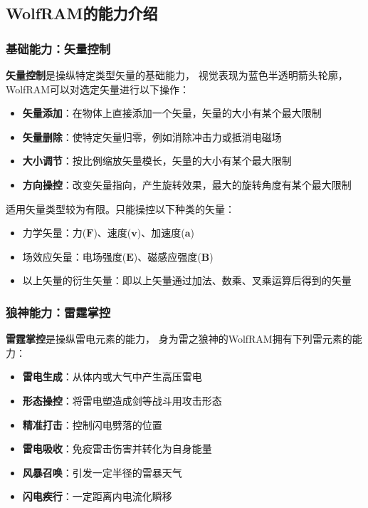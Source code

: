 \documentclass[lang=cn,newtx,10pt,scheme=chinese]{elegantbook}
\newcommand{\wf}{WolfRAM}
\begin{document}
\newpage

\subsection{\wf{}的能力介绍}
\subsubsection{基础能力：矢量控制}
\textbf{矢量控制}是操纵特定类型矢量的基础能力，
视觉表现为蓝色半透明箭头轮廓，
\wf{}可以对选定矢量进行以下操作：

\begin{itemize}
    \item \textbf{矢量添加}：在物体上直接添加一个矢量，矢量的大小有某个最大限制
    \item \textbf{矢量删除}：使特定矢量归零，例如消除冲击力或抵消电磁场
    \item \textbf{大小调节}：按比例缩放矢量模长，矢量的大小有某个最大限制
    \item \textbf{方向操控}：改变矢量指向，产生旋转效果，最大的旋转角度有某个最大限制
\end{itemize}

适用矢量类型较为有限。只能操控以下种类的矢量：
\begin{itemize}
    \item 力学矢量：力($\bm{F}$)、速度($\bm{v}$)、加速度($\bm{a}$)
    \item 场效应矢量：电场强度($\bm{E}$)、磁感应强度($\bm{B}$)
    \item 以上矢量的衍生矢量：即以上矢量通过加法、数乘、叉乘运算后得到的矢量
\end{itemize}

\subsubsection{狼神能力：雷霆掌控}

\textbf{雷霆掌控}是操纵雷电元素的能力，
身为雷之狼神的\wf{}拥有下列雷元素的能力：

\begin{itemize}
    \setlength\itemsep{0em}
    \item \textbf{雷电生成}：从体内或大气中产生高压雷电
    \item \textbf{形态操控}：将雷电塑造成剑等战斗用攻击形态
    \item \textbf{精准打击}：控制闪电劈落的位置
    \item \textbf{雷电吸收}：免疫雷击伤害并转化为自身能量
    \item \textbf{风暴召唤}：引发一定半径的雷暴天气
    \item \textbf{闪电疾行}：一定距离内电流化瞬移
\end{itemize}
\end{document}
